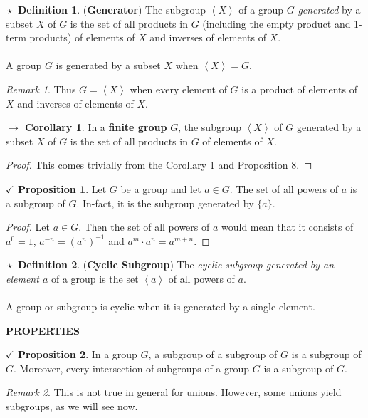 \documentclass{article}
\theoremstyle{definition}
\newtheorem{definition}{$\boxed{\star}$ Definition}
\theoremstyle{remark}
\newtheorem*{remark}{Remark}
\theoremstyle{definition}
\newtheorem{corollary}{$ \to $ Corollary}
\theoremstyle{definition}
\newtheorem{proposition}{$\checkmark$ Proposition}
\theoremstyle{definition}
\theoremstyle{proof}
\newcommand{\inv}[1]{#1^{-1}}
\newcommand{\gen}[1]{\left\langle #1\right\rangle}
\begin{document}
\hrulefill
\begin{definition}
	(\textbf{Generator}) The subgroup $ \gen{X} $ of a group $ G $ \emph{generated} by a subset $ X $ of $ G $ is the set of all products in $ G $ (including the empty product and 1-term products) of elements of $ X $ and inverses of elements of $ X $.\\\\
	A group $ G $ is generated by a subset $ X $ when $ \gen{X} = G $.
\end{definition}
\begin{remark}
	Thus $ G = \gen{X} $ when every element of $ G $ is a product of elements of $ X $ and inverses of elements of $ X $.
\end{remark}
\begin{corollary}
	In a \textbf{finite group} $ G $, the subgroup $ \gen{X} $ of $ G $ generated by a subset $ X $ of $ G $ is the set of all products in $ G $ of elements of $ X $.
\end{corollary}
\begin{proof}
	This comes trivially from the Corollary 1 and Proposition 8.
\end{proof}
\hrulefill
\begin{proposition}
	Let $ G $ be a group and let $ a \in G $. The set of all powers of $ a $ is a subgroup of $ G $. In-fact, it is the subgroup generated by $ \{a\} $.
\end{proposition}
\begin{proof}
	Let $ a \in G $. Then the set of all powers of $ a $ would mean that it consists of $ a^0 = 1 $, $ a ^ {-n}=\inv{(a^n)}  $ and $ a^m \cdot a^n = a^{m+n} $.
\end{proof}
\hrulefill
\begin{definition}
	(\textbf{Cyclic Subgroup}) The \emph{cyclic subgroup generated by an element $ a $} of a group is the set $ \gen{a} $ of all powers of $ a $. \\\\
	A group or subgroup is cyclic when it is generated by a single element.
\end{definition}
\newpage
\hrulefill
\textbf{PROPERTIES}
\hrulefill
\begin{proposition}
	In a group $ G $, a subgroup of a subgroup of $ G $ is a subgroup of $ G $. Moreover, every intersection of subgroups of a group  $ G $ is a subgroup of $ G $.
\end{proposition}
\begin{remark}
	This is not true in general for unions. However, some unions yield subgroups, as we will see now.
\end{remark}
\end{document}
